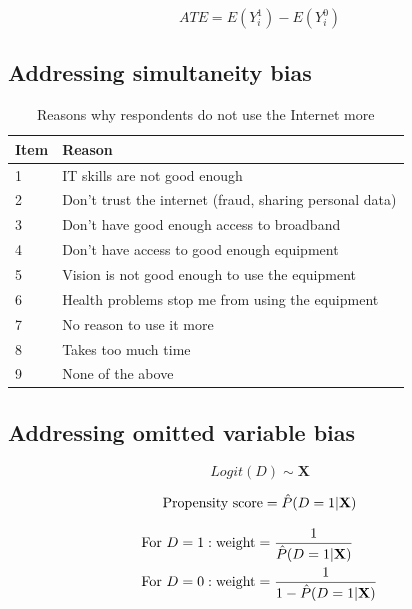 \begin{equation}
    \label{eq:ate}
    ATE = E(Y_i^1) - E(Y_i^0)
\end{equation}


\subsection{Addressing simultaneity bias}


\begin{table}[h!]
    \centering
    \caption{Reasons why respondents do not use the Internet more}
    \label{tab:reverse_causality}
    \begin{tabular}{ll}
        \toprule
        Item & Reason \\
        \midrule
        1 & IT skills are not good enough \\
        2 & Don't trust the internet (fraud, sharing personal data) \\
        3 & Don't have good enough access to broadband \\
        4 & Don't have access to good enough equipment \\
        5 & Vision is not good enough to use the equipment \\ 
        6 & Health problems stop me from using the equipment \\ 
        7 & No reason to use it more \\
        8 & Takes too much time \\
        9 & None of the above \\
        \bottomrule
    \end{tabular}
\end{table}


\subsection{Addressing omitted variable bias}


\begin{equation}
    \label{eq:logit}
    Logit(D) \sim \textbf{X}
\end{equation}

\begin{equation}
    \label{eq:propensity_score}
    \textnormal{Propensity score} = \hat{P}(D = 1 | \textbf{X})
\end{equation}


\begin{equation}
    \label{eq:raw_weights}
    \begin{aligned}
        \textnormal{For } D &= 1: \textnormal{weight} = \frac{1}{\hat{P}(D = 1 | \textbf{X})} \\
        \textnormal{For } D &= 0: \textnormal{weight} = \frac{1}{1 - \hat{P}(D = 1 | \textbf{X})}
    \end{aligned}
\end{equation}



